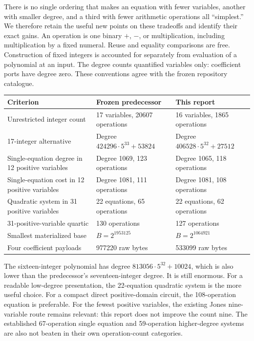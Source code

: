\documentclass[11pt]{article}
\theoremstyle{definition}\newtheorem{definition}[theorem]{Definition}
\theoremstyle{remark}\newtheorem{remark}[theorem]{Remark}
\begin{document}
There is no single ordering that makes an equation with fewer variables,
another with smaller degree, and a third with fewer arithmetic operations
all ``simplest.'' We therefore retain the useful new points on these
tradeoffs and identify their exact gains. An operation is one binary
$+$, $-$, or multiplication, including multiplication by a fixed numeral.
Reuse and equality comparisons are free. Construction of fixed integers
is accounted for separately from evaluation of a polynomial at an input.
The degree counts quantified variables only: coefficient ports have degree
zero. These conventions agree with the frozen repository catalogue.

\begin{center}\small
\begin{tabular}{@{}p{}p{}p{}@{}}
\toprule
Criterion & Frozen predecessor & This report\\
\midrule
Unrestricted integer count & 17 variables, 20607 operations &
16 variables, 1865 operations\\
17-integer alternative & Degree $424296\cdot5^{33}+53824$ &
Degree $406528\cdot5^{32}+27512$\\
Single-equation degree in 12 positive variables & Degree 1069, 123 operations &
Degree 1065, 118 operations\\
Single-equation cost in 12 positive variables & Degree 1081, 111 operations &
Degree 1081, 108 operations\\
Quadratic system in 31 positive variables & 22 equations, 65 operations &
22 equations, 62 operations\\
31-positive-variable quartic & 130 operations & 127 operations\\
Smallest materialized base & $B=2^{1953125}$ & $B=2^{1064921}$\\
Four coefficient payloads & 977220 raw bytes & 533099 raw bytes\\
\bottomrule
\end{tabular}
\end{center}

The sixteen-integer polynomial has degree
$813056\cdot5^{32}+10024$, which is also lower than the predecessor's
seventeen-integer degree. It is still enormous. For a readable low-degree
presentation, the 22-equation quadratic system is the more useful choice.
For a compact direct positive-domain circuit, the 108-operation equation
is preferable. For the fewest positive variables, the existing Jones
nine-variable route remains relevant: this report does not improve the
count nine. The established 67-operation single equation and
59-operation higher-degree systems are also not beaten in their own
operation-count categories.
\end{document}

